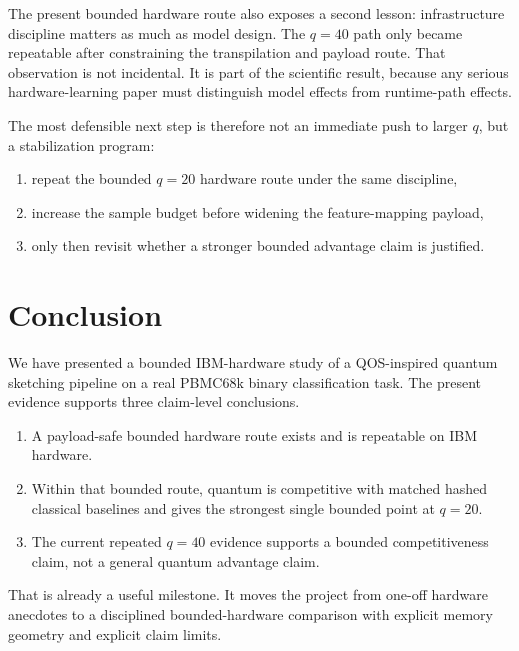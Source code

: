\documentclass[11pt]{article}
\begin{document}
The present bounded hardware route also exposes a second lesson: infrastructure discipline matters as much as model design. The $q=40$ path only became repeatable after constraining the transpilation and payload route. That observation is not incidental. It is part of the scientific result, because any serious hardware-learning paper must distinguish model effects from runtime-path effects.

The most defensible next step is therefore not an immediate push to larger $q$, but a stabilization program:
\begin{enumerate}
\item repeat the bounded $q=20$ hardware route under the same discipline,
\item increase the sample budget before widening the feature-mapping payload,
\item only then revisit whether a stronger bounded advantage claim is justified.
\end{enumerate}

\section{Conclusion}

We have presented a bounded IBM-hardware study of a QOS-inspired quantum sketching pipeline on a real PBMC68k binary classification task. The present evidence supports three claim-level conclusions.

\begin{enumerate}
\item A payload-safe bounded hardware route exists and is repeatable on IBM hardware.
\item Within that bounded route, quantum is competitive with matched hashed classical baselines and gives the strongest single bounded point at $q=20$.
\item The current repeated $q=40$ evidence supports a bounded competitiveness claim, not a general quantum advantage claim.
\end{enumerate}

That is already a useful milestone. It moves the project from one-off hardware anecdotes to a disciplined bounded-hardware comparison with explicit memory geometry and explicit claim limits.



\end{document}
